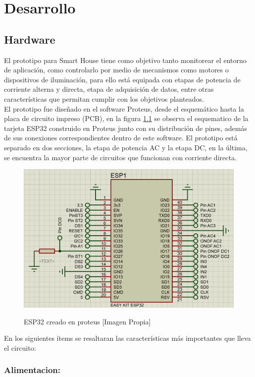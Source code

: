 \chapter{Desarrollo}

\section{Hardware}

El prototipo para Smart House tiene como objetivo tanto monitorear el entorno de aplicación, como controlarlo por medio de mecanismos como motores o dispositivos de iluminación, para ello está equipada con etapas de potencia de corriente alterna y directa, etapa de adquisición de datos, entre otras características que permitan cumplir con los objetivos planteados.\\ 

El prototipo fue diseñado en el software Proteus, desde el esquemático hasta la placa de circuito impreso (PCB), en la figura \ref{fig:esp32} se observa el esquematico de la tarjeta ESP32 construido en Proteus junto con su distribución de pines, además de sus conexiones correspondientes dentro de este software. El prototipo está separado en dos secciones, la etapa de potencia AC y la etapa DC, en la última, se encuentra la mayor parte de circuitos que funcionan con corriente directa.\\

\begin{figure}[H]
	\centering
	\caption{ESP32 creado en proteus [Imagen Propia]}
	\includegraphics[width=0.5\linewidth]{Imagenes/ESP32}	
	\label{fig:esp32}
\end{figure}

En los siguientes ítems se resaltaran las características más importantes que lleva el circuito:\\

	\subsection{Alimentacion:}
	
